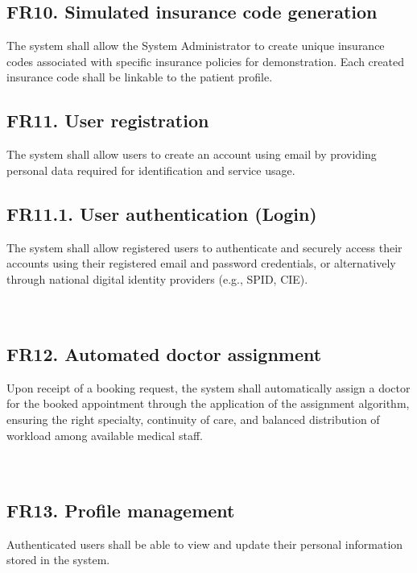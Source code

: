 \documentclass[12pt, a4paper]{article}
\begin{document}
\subsection{FR10. Simulated insurance code generation} \label{FR10} 
The system shall allow the System Administrator to create unique insurance codes associated with specific insurance policies for demonstration. Each created insurance code shall be linkable to the patient profile.
\\ 

\subsection{FR11. User registration} \label{FR11}
The system shall allow users to create an account using email by providing personal data required for identification and service usage.
\\ 

\subsection{FR11.1. User authentication (Login)} 
The system shall allow registered users to authenticate and securely access their accounts using their registered email and password credentials, or alternatively through national digital identity providers (e.g., SPID, CIE).
\\ 
\\ 
\\ 

\subsection{FR12. Automated doctor assignment} \label{FR12}
Upon receipt of a booking request, the system shall automatically assign a doctor for the booked appointment through the application of the assignment algorithm, ensuring the right specialty, continuity of care, and balanced distribution of workload among available medical staff.
\\ 
\\ 
\\ 

\subsection{FR13. Profile management} \label{FR13}
Authenticated users shall be able to view and update their personal information stored in the system.
\\ 
\\ 
\end{document}

